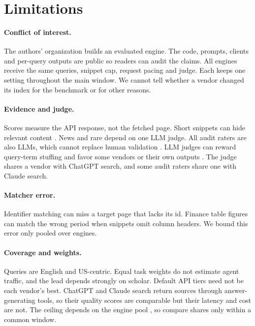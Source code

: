 \documentclass[11pt]{article}
\begin{document}
\section*{Limitations}

\paragraph{Conflict of interest.}
The authors' organization builds an evaluated engine. The code, prompts,
clients and per-query outputs are public so readers can audit the claims.
All engines receive the same queries, snippet cap, request pacing and
judge. Each keeps one setting throughout the main window. We cannot tell
whether a vendor changed its index for the benchmark or for other reasons.

\paragraph{Evidence and judge.}
Scores measure the API response, not the fetched page. Short snippets can
hide relevant content \citep{turpin2009summaries,kazai2022less}. News and rare depend on one LLM judge.
All audit raters are also LLMs, which cannot replace human validation
\citep{faggioli2023perspectives,clarke2025llmbased}. LLM judges can
reward query-term stuffing \citep{alaofi2024fooled} and favor some
vendors or their own outputs
\citep{balog2025rankers,soboroff2025dont,panickssery2024self}. The judge
shares a vendor with ChatGPT search, and some audit raters share one
with Claude search.

\paragraph{Matcher error.}
Identifier matching can miss a target page that lacks its id. Finance
table figures can match the wrong period when snippets omit column
headers. We bound this error only pooled over engines.

\paragraph{Coverage and weights.}
Queries are English and US-centric. Equal task weights do not estimate
agent traffic, and the lead depends strongly on scholar. Default API tiers
need not be each vendor's best. ChatGPT and Claude search return sources
through answer-generating tools, so their quality scores are comparable
but their latency and cost are not. The ceiling depends on the engine
pool \citep{buckley2007bias}, so compare shares only within a common
window.
\end{document}
